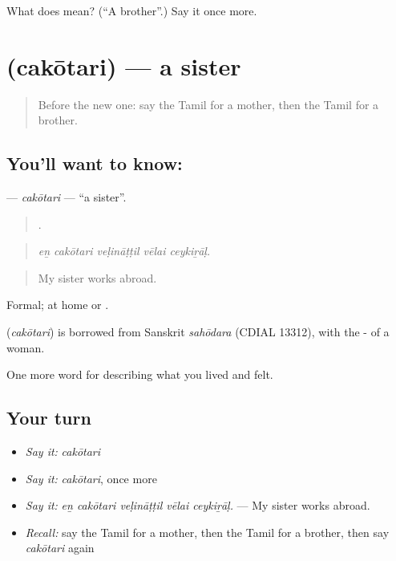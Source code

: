 \begin{tcolorbox}[breakable,colback=teal!4,colframe=teal!35!black,title={Before you move on}]
What does  mean? (\textquotedblleft{}A brother\textquotedblright{}.) Say it once more.
\end{tcolorbox}
\section[\texorpdfstring{\ta{சகோதரி} (cakōtari)}{சகோதரி (cakōtari)}]{ (cakōtari) — a sister}

\label{lesson:TA-C492-cakotari}



\begin{quote}
Before the new one: say the Tamil for a mother, then the Tamil for a brother.
\end{quote}

\subsection*{You'll want to know: }
\textbf{} — \emph{cakōtari} — \textquotedblleft{}a sister\textquotedblright{}.

\begin{quote}
    .
\end{quote}

\begin{quote}
\emph{eṉ cakōtari veḷināṭṭil vēlai ceykiṟāḷ.}
\end{quote}

\begin{quote}
My sister works abroad.
\end{quote}

Formal; at home  or .

\begin{cousinweb}
\textbf{} (\emph{cakōtari}) is borrowed from Sanskrit \emph{sahōdara} (CDIAL 13312), with the - of a woman.
\end{cousinweb}

\begin{grammarlens}[title={What you've built}]
One more word for describing what you lived and felt.
\end{grammarlens}

\subsection*{Your turn}
\begin{itemize}
\raggedright
  \item \emph{Say it:} \emph{cakōtari}
  \item \emph{Say it:} \emph{cakōtari}, once more
  \item \emph{Say it:} \emph{eṉ cakōtari veḷināṭṭil vēlai ceykiṟāḷ.} — My sister works abroad.
  \item \emph{Recall:} say the Tamil for a mother, then the Tamil for a brother, then say \emph{cakōtari} again
\end{itemize}

